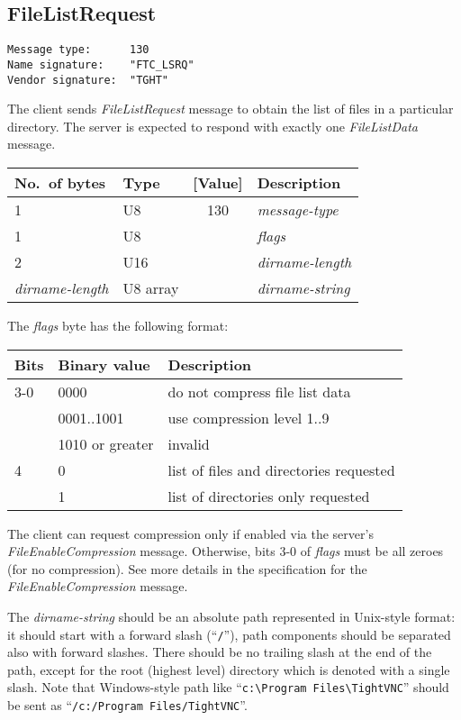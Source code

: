 \documentclass[a4paper]{article}
\newcommand{\typestr}[1]{\textit{#1}}
\begin{document}
\subsection{FileListRequest}
\begin{verbatim}
Message type:      130
Name signature:    "FTC_LSRQ"
Vendor signature:  "TGHT"
\end{verbatim}

The client sends \typestr{FileListRequest} message to obtain the list
of files in a particular directory. The server is expected to respond
with exactly one \typestr{FileListData} message.

\begin{tabular}{l|lc|l} \hline
No.\ of bytes & Type & [Value] & Description \\ \hline
1 & U8  & 130 & \typestr{message-type} \\
1 & U8  &     & \typestr{flags} \\
2 & U16 &     & \typestr{dirname-length} \\
\typestr{dirname-length} & U8 array & & \typestr{dirname-string} \\
\hline\end{tabular}

The \typestr{flags} byte has the following format:

\begin{tabular}{l|l|l}
\hline
Bits & Binary value   & Description \\ \hline
3-0 & 0000            & do not compress file list data \\
    & 0001..1001      & use compression level 1..9 \\
    & 1010 or greater & invalid \\
\hline
4   & 0   & list of files and directories requested \\
    & 1   & list of directories only requested \\
\hline
\end{tabular}

The client can request compression only if enabled via the server's
\typestr{FileEnableCompression} message. Otherwise, bits 3-0 of
\typestr{flags} must be all zeroes (for no compression). See more
details in the specification for the \typestr{FileEnableCompression}
message.


The \typestr{dirname-string} should be an absolute path represented in
Unix-style format: it should start with a forward slash
(``\verb|/|''), path components should be separated also with forward
slashes. There should be no trailing slash at the end of the path,
except for the root (highest level) directory which is denoted with a
single slash. Note that Windows-style path like
``\verb|c:\Program Files\TightVNC|'' should be sent as
``\verb|/c:/Program Files/TightVNC|''.
\end{document}
